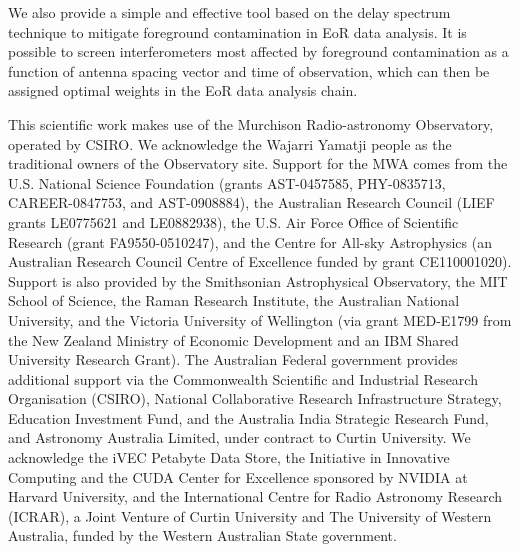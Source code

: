\documentclass[preprint2,iop,numberedappendix]{emulateapj}
\begin{document}
We also provide a simple and effective tool based on the delay spectrum technique to mitigate foreground contamination in EoR data analysis. It is possible to screen interferometers most affected by foreground contamination as a function of antenna spacing vector and time of observation, which can then be assigned optimal weights in the EoR data analysis chain.

\acknowledgments

This scientific work makes use of the Murchison Radio-astronomy Observatory, operated by CSIRO. We acknowledge the Wajarri Yamatji people as the traditional owners of the Observatory site. Support for the MWA comes from the U.S. National Science Foundation (grants AST-0457585, PHY-0835713, CAREER-0847753, and AST-0908884), the Australian Research Council (LIEF grants LE0775621 and LE0882938), the U.S. Air Force Office of Scientific Research (grant FA9550-0510247), and the Centre for All-sky Astrophysics (an Australian Research Council Centre of Excellence funded by grant CE110001020). Support is also provided by the Smithsonian Astrophysical Observatory, the MIT School of Science, the Raman Research Institute, the Australian National University, and the Victoria University of Wellington (via grant MED-E1799 from the New Zealand Ministry of Economic Development and an IBM Shared University Research Grant). The Australian Federal government provides additional support via the Commonwealth Scientific and Industrial Research Organisation (CSIRO), National Collaborative Research Infrastructure Strategy, Education Investment Fund, and the Australia India Strategic Research Fund, and Astronomy Australia Limited, under contract to Curtin University. We acknowledge the iVEC Petabyte Data Store, the Initiative in Innovative Computing and the CUDA Center for Excellence sponsored by NVIDIA at Harvard University, and the International Centre for Radio Astronomy Research (ICRAR), a Joint Venture of Curtin University and The University of Western Australia, funded by the Western Australian State government. 

\appendix

\par\bigskip


\end{document}
